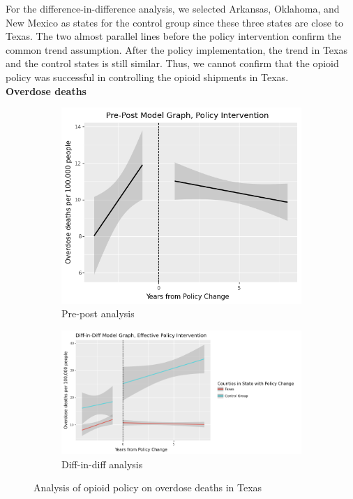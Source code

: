 \documentclass[12pt,letterpaper]{article}
\begin{document}
For the difference-in-difference analysis, we selected Arkansas, Oklahoma, and New Mexico as states for the control group since these three states are close to Texas. The two almost parallel lines before the policy intervention confirm the common trend assumption. After the policy implementation, the trend in Texas and the control states is still similar. Thus, we cannot confirm that the opioid policy was successful in controlling the opioid shipments in Texas. \\

\noindent \textbf{Overdose deaths}

\begin{figure}[!h]
\centering
\begin{subfigure}{.5\textwidth}
  \centering
  \includegraphics[width=0.7\linewidth]{../30_results/General_Results/texas_overdose_death_prepost.png}
  \caption{Pre-post analysis}
  \label{fig:tx_death_prepost}
\end{subfigure}%
\begin{subfigure}{.55\textwidth}
  \centering
  \includegraphics[width=1\linewidth]{../30_results/General_Results/texas_overdose_death_diffdiff.png}
  \caption{Diff-in-diff analysis}
  \label{fig:tx_death_did}
\end{subfigure}
\caption{Analysis of opioid policy on overdose deaths in Texas}
\label{fig:tx_death}
\end{figure}
\end{document}
